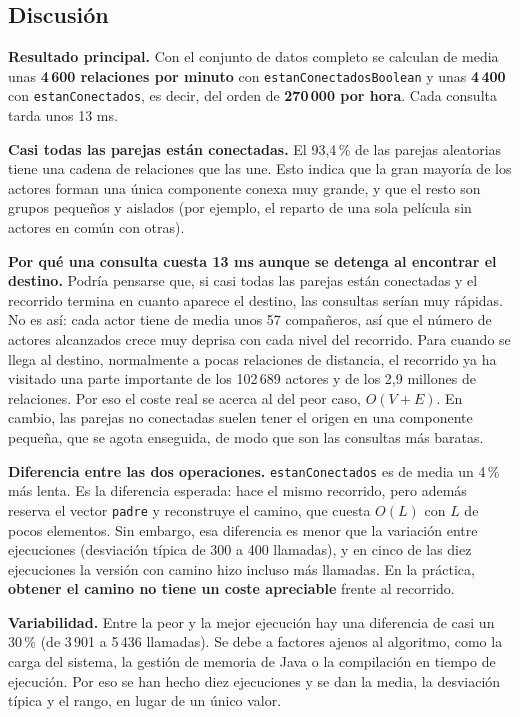 \documentclass[a4paper,11pt]{report}
\begin{document}
\subsection{Discusión}


\textbf{Resultado principal.} Con el conjunto de datos completo se calculan de media unas \textbf{4\,600 relaciones por minuto} con \texttt{estanConectadosBoolean} y unas \textbf{4\,400} con \texttt{estanConectados}, es decir, del orden de \textbf{270\,000 por hora}. Cada consulta tarda unos 13 ms.

\textbf{Casi todas las parejas están conectadas.} El 93{,}4\,\% de las parejas aleatorias tiene una cadena de relaciones que las une. Esto indica que la gran mayoría de los actores forman una única componente conexa muy grande, y que el resto son grupos pequeños y aislados (por ejemplo, el reparto de una sola película sin actores en común con otras).

\textbf{Por qué una consulta cuesta 13 ms aunque se detenga al encontrar el destino.} Podría pensarse que, si casi todas las parejas están conectadas y el recorrido termina en cuanto aparece el destino, las consultas serían muy rápidas. No es así: cada actor tiene de media unos 57 compañeros, así que el número de actores alcanzados crece muy deprisa con cada nivel del recorrido. Para cuando se llega al destino, normalmente a pocas relaciones de distancia, el recorrido ya ha visitado una parte importante de los 102\,689 actores y de los 2{,}9 millones de relaciones. Por eso el coste real se acerca al del peor caso, $O(V+E)$. En cambio, las parejas no conectadas suelen tener el origen en una componente pequeña, que se agota enseguida, de modo que son las consultas más baratas.

\textbf{Diferencia entre las dos operaciones.} \texttt{estanConectados} es de media un 4\,\% más lenta. Es la diferencia esperada: hace el mismo recorrido, pero además reserva el vector \texttt{padre} y reconstruye el camino, que cuesta $O(L)$ con $L$ de pocos elementos. Sin embargo, esa diferencia es menor que la variación entre ejecuciones (desviación típica de 300 a 400 llamadas), y en cinco de las diez ejecuciones la versión con camino hizo incluso más llamadas. En la práctica, \textbf{obtener el camino no tiene un coste apreciable} frente al recorrido.

\textbf{Variabilidad.} Entre la peor y la mejor ejecución hay una diferencia de casi un 30\,\% (de 3\,901 a 5\,436 llamadas). Se debe a factores ajenos al algoritmo, como la carga del sistema, la gestión de memoria de Java o la compilación en tiempo de ejecución. Por eso se han hecho diez ejecuciones y se dan la media, la desviación típica y el rango, en lugar de un único valor.
\end{document}
